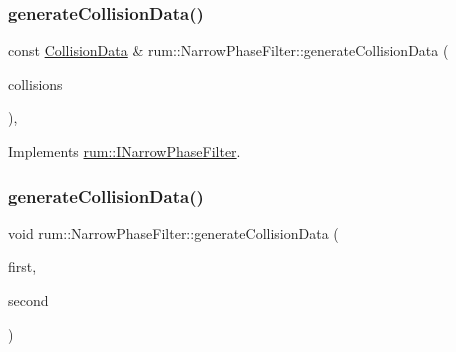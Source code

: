 \subsubsection{\texorpdfstring{generate\+Collision\+Data()}{generateCollisionData()}\hspace{0.1cm}{\footnotesize\ttfamily [1/5]}}
{\footnotesize\ttfamily const \mbox{\hyperlink{classrum_1_1_collision_data}{Collision\+Data}} \& rum\+::\+Narrow\+Phase\+Filter\+::generate\+Collision\+Data (\begin{DoxyParamCaption}\item[{const std\+::vector$<$ \mbox{\hyperlink{structrum_1_1_broad_phase_collision}{Broad\+Phase\+Collision}} $>$ \&}]{collisions }\end{DoxyParamCaption})\hspace{0.3cm}{\ttfamily [override]}, {\ttfamily [virtual]}}



Implements \mbox{\hyperlink{classrum_1_1_i_narrow_phase_filter_acfce7d2c3d62880920b1ca415f891526}{rum\+::\+I\+Narrow\+Phase\+Filter}}.

\mbox{\label{classrum_1_1_narrow_phase_filter_a02edd873c8c7711aa3ef6249cae6ca1e}} 
\subsubsection{\texorpdfstring{generate\+Collision\+Data()}{generateCollisionData()}\hspace{0.1cm}{\footnotesize\ttfamily [2/5]}}
{\footnotesize\ttfamily void rum\+::\+Narrow\+Phase\+Filter\+::generate\+Collision\+Data (\begin{DoxyParamCaption}\item[{\mbox{\hyperlink{classrum_1_1_rigid_body}{Rigid\+Body}} $\ast$}]{first,  }\item[{\mbox{\hyperlink{classrum_1_1_rigid_body}{Rigid\+Body}} $\ast$}]{second }\end{DoxyParamCaption})}

\mbox{\label{classrum_1_1_narrow_phase_filter_ab72aba07867b2cbe21bd7f046f9a5e77}} 
